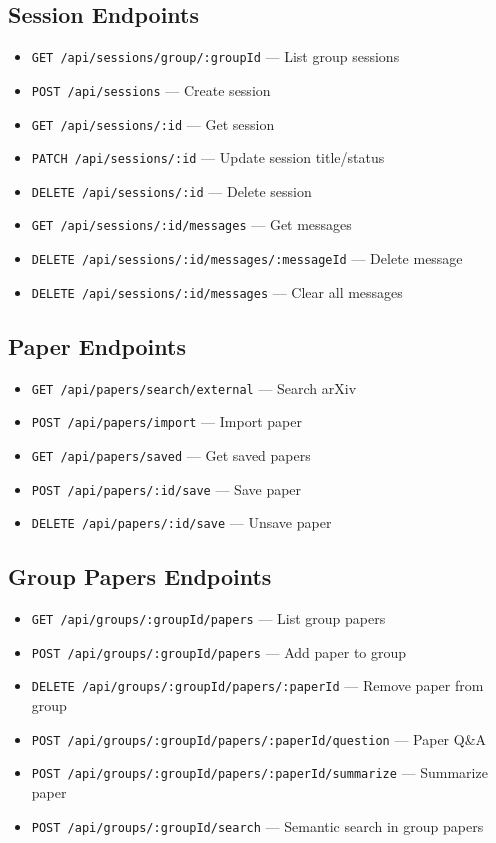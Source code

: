 \documentclass[11pt,a4paper]{article}
\begin{document}
\subsection{Session Endpoints}

\begin{itemize}
    \item \texttt{GET /api/sessions/group/:groupId} --- List group sessions
    \item \texttt{POST /api/sessions} --- Create session
    \item \texttt{GET /api/sessions/:id} --- Get session
    \item \texttt{PATCH /api/sessions/:id} --- Update session title/status
    \item \texttt{DELETE /api/sessions/:id} --- Delete session
    \item \texttt{GET /api/sessions/:id/messages} --- Get messages
    \item \texttt{DELETE /api/sessions/:id/messages/:messageId} --- Delete message
    \item \texttt{DELETE /api/sessions/:id/messages} --- Clear all messages
\end{itemize}

\subsection{Paper Endpoints}

\begin{itemize}
    \item \texttt{GET /api/papers/search/external} --- Search arXiv
    \item \texttt{POST /api/papers/import} --- Import paper
    \item \texttt{GET /api/papers/saved} --- Get saved papers
    \item \texttt{POST /api/papers/:id/save} --- Save paper
    \item \texttt{DELETE /api/papers/:id/save} --- Unsave paper
\end{itemize}

\subsection{Group Papers Endpoints}

\begin{itemize}
    \item \texttt{GET /api/groups/:groupId/papers} --- List group papers
    \item \texttt{POST /api/groups/:groupId/papers} --- Add paper to group
    \item \texttt{DELETE /api/groups/:groupId/papers/:paperId} --- Remove paper from group
    \item \texttt{POST /api/groups/:groupId/papers/:paperId/question} --- Paper Q\&A
    \item \texttt{POST /api/groups/:groupId/papers/:paperId/summarize} --- Summarize paper
    \item \texttt{POST /api/groups/:groupId/search} --- Semantic search in group papers
\end{itemize}
\end{document}
